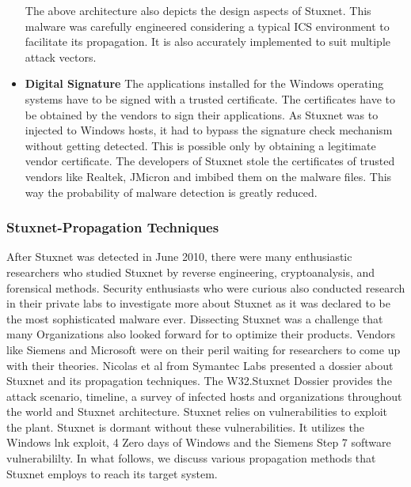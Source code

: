 \documentclass[article,msc=informatik,type=msc,colorback,accentcolor=tud9c]{tudthesis}
\begin{document}
\begin{itemize}
\begin{enumerate}
	\end{enumerate}

	The above architecture also depicts the design aspects of Stuxnet. This malware was carefully engineered considering a typical \ac{ICS} environment to facilitate its propagation. It is also accurately implemented to suit multiple attack vectors. 


	\item\textbf{Digital Signature} The applications installed for the Windows operating systems have to be signed with a trusted certificate. The certificates have to be obtained by the vendors to sign their applications. As Stuxnet was to injected to Windows hosts, it had to bypass the signature check mechanism without getting detected. This is possible only by obtaining a legitimate vendor certificate. The developers of Stuxnet stole the certificates of trusted vendors like Realtek, JMicron and imbibed them on the malware files. This way the probability of malware detection is greatly reduced.

	

	\end{itemize} 

	

	

	\subsubsection{Stuxnet-Propagation Techniques}\label{Stuxnet-Propagation Techniques}
	After Stuxnet was detected in June 2010, there were many enthusiastic researchers who studied Stuxnet by reverse engineering, cryptoanalysis, and forensical methods. Security enthusiasts who were curious also conducted research in their private labs to investigate more about Stuxnet as it was declared to be the most sophisticated malware ever. Dissecting Stuxnet was a challenge that many Organizations also looked forward for to optimize their products. Vendors like Siemens and Microsoft were on their peril waiting for researchers to come up with their theories.  Nicolas et al \cite{falliere2011w32} from Symantec Labs presented a dossier about Stuxnet and its propagation techniques. The W32.Stuxnet Dossier provides the attack scenario, timeline, a survey of infected hosts and organizations throughout the world and Stuxnet architecture. Stuxnet relies on vulnerabilities to exploit the plant. Stuxnet is dormant without these vulnerabilities. It utilizes the Windows lnk exploit, 4 Zero days of Windows and the Siemens Step 7 software vulnerabililty. In what follows, we discuss various propagation methods that Stuxnet employs to reach its target system.
\end{document}
